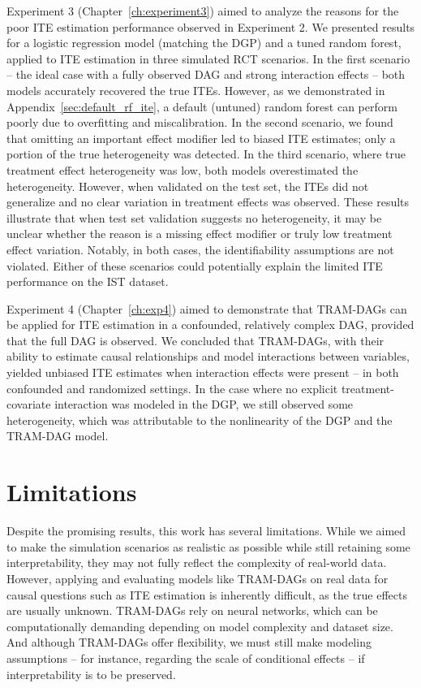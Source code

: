 \medskip

Experiment 3 (Chapter~\ref{ch:experiment3}) aimed to analyze the reasons for the poor ITE estimation performance observed in Experiment 2. We presented results for a logistic regression model (matching the DGP) and a tuned random forest, applied to ITE estimation in three simulated RCT scenarios. In the first scenario -- the ideal case with a fully observed DAG and strong interaction effects -- both models accurately recovered the true ITEs. However, as we demonstrated in Appendix~\ref{sec:default_rf_ite}, a default (untuned) random forest can perform poorly due to overfitting and miscalibration. In the second scenario, we found that omitting an important effect modifier led to biased ITE estimates; only a portion of the true heterogeneity was detected. In the third scenario, where true treatment effect heterogeneity was low, both models overestimated the heterogeneity. However, when validated on the test set, the ITEs did not generalize and no clear variation in treatment effects was observed. These results illustrate that when test set validation suggests no heterogeneity, it may be unclear whether the reason is a missing effect modifier or truly low treatment effect variation. Notably, in both cases, the identifiability assumptions are not violated. Either of these scenarios could potentially explain the limited ITE performance on the IST dataset.

\medskip

Experiment 4 (Chapter~\ref{ch:exp4}) aimed to demonstrate that TRAM-DAGs can be applied for ITE estimation in a confounded, relatively complex DAG, provided that the full DAG is observed. We concluded that TRAM-DAGs, with their ability to estimate causal relationships and model interactions between variables, yielded unbiased ITE estimates when interaction effects were present -- in both confounded and randomized settings. In the case where no explicit treatment-covariate interaction was modeled in the DGP, we still observed some heterogeneity, which was attributable to the nonlinearity of the DGP and the TRAM-DAG model.



\section{Limitations}

Despite the promising results, this work has several limitations. While we aimed to make the simulation scenarios as realistic as possible while still retaining some interpretability, they may not fully reflect the complexity of real-world data. However, applying and evaluating models like TRAM-DAGs on real data for causal questions such as ITE estimation is inherently difficult, as the true effects are usually unknown. TRAM-DAGs rely on neural networks, which can be computationally demanding depending on model complexity and dataset size. And although TRAM-DAGs offer flexibility, we must still make modeling assumptions -- for instance, regarding the scale of conditional effects -- if interpretability is to be preserved.



